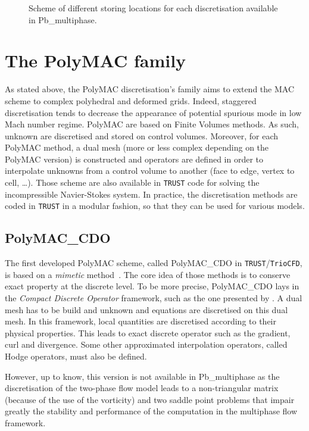 \begin{figure}[htbp]
\begin{subfigure}[b]{0.45\textwidth}
    \label{PolyVEF}
  \end{subfigure}
  \caption{Scheme of different storing locations for each discretisation available in Pb\_multiphase.}
  \label{Spatialdiscretisation}
\end{figure}

\section{The PolyMAC family\label{sec:polymac-family}}
As stated above, the PolyMAC discretisation's family aims to extend the MAC scheme to complex polyhedral and deformed grids. Indeed, staggered discretisation tends to decrease the appearance of potential spurious mode in low Mach number regime. PolyMAC are based on Finite Volumes methods. As such, unknown are discretised and stored on control volumes. Moreover, for each PolyMAC method, a dual mesh (more or less complex depending on the PolyMAC version) is constructed and operators are defined in order to interpolate unknowns from a control volume to another (face to edge, vertex to cell, \ldots). Those scheme are also available in \texttt{TRUST} code for solving the incompressible Navier-Stokes system. In practice, the discretisation methods are coded in \texttt{TRUST} in a modular fashion, so that they can be used for various models. 

\subsection{PolyMAC_CDO}
The first developed PolyMAC scheme, called PolyMAC_CDO in \texttt{TRUST}/\texttt{TrioCFD}, is based on a \textit{mimetic} method~\cite{lipnikov2014mimetic}. The core idea of those methods is to conserve exact property at the discrete level. To be more precise, PolyMAC_CDO lays in the \textit{Compact Discrete Operator} framework, such as the one presented by \cite{bonelle2014,milani2020}. A dual mesh has to be build and unknown and equations are discretised on this dual mesh. In this framework, local quantities are discretised according to their physical properties. This leads to exact discrete operator such as the gradient, curl and divergence. Some other approximated interpolation operators, called Hodge operators, must also be defined.

However, up to know, this version is not available in Pb\_multiphase as the discretisation of the two-phase flow model leads to a non-triangular matrix (because of the use of the vorticity) and two saddle point problems that impair greatly the stability and performance of the computation in the multiphase flow framework. 

